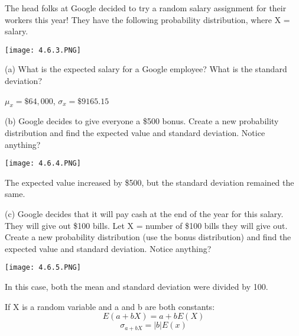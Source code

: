 \documentclass[../stats.tex]{subfiles}
\begin{document}
\pagebreak
\begin{example}
    The head folks at Google decided to try a random salary assignment for their workers this year!
    They have the following probability distribution, where X = salary.
    \begin{center}
        \texttt{[image: 4.6.3.PNG]}
    \end{center}

    (a) What is the expected salary for a Google employee? What is the standard deviation?

    $\mu_x=\$64,000$, $\sigma_x = \$9165.15$

    (b) Google decides to give everyone a \$500 bonus. Create a new probability distribution and find the expected value and standard deviation. Notice anything?
    \begin{center}
        \texttt{[image: 4.6.4.PNG]}
    \end{center}
    The expected value increased by \$500, but the standard deviation remained the same.

    (c) Google decides that it will pay cash at the end of the year for this salary. They will give out \$100 bills. Let X = number of \$100 bills they will give out. Create a new 
    probability distribution (use the bonus distribution) and find the expected value and standard deviation. Notice anything?
    \begin{center}
        \texttt{[image: 4.6.5.PNG]}
    \end{center}
    In this case, both the mean and standard deviation were divided by 100.
\end{example}

If X is a random variable and a and b are both constants:
\[ E(a+bX)=a+bE(X)\]
\[ \sigma_{a+bX}=|b|E(x)\]
\end{document}
